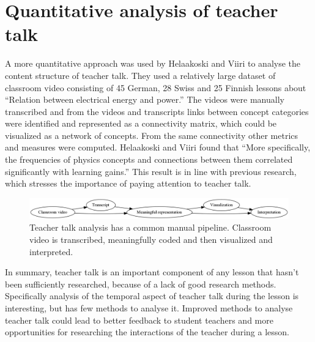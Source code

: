 \documentclass[utf8,english]{gradu3}
\begin{document}
\section{Quantitative analysis of teacher talk}
A more quantitative approach was used by Helaakoski and Viiri \parencite{helaakoskiContentContentStructure2014} to analyse the content structure of teacher talk. They used a relatively large dataset of classroom video consisting of 45 German, 28 Swiss and 25 Finnish lessons about \enquote{Relation  between  electrical  energy  and  power.} The videos were manually transcribed and from the videos and transcripts links between concept categories were identified and represented as a connectivity matrix, which could be visualized as a network of concepts. From the same connectivity other metrics and measures were computed. Helaakoski and Viiri \parencite*{helaakoskiContentContentStructure2014} found that \enquote{More  specifically,  the  frequencies  of  physics  concepts  and  connections  between  them  correlated  significantly  with  learning  gains.} This result is in line with previous research, which stresses the importance of paying attention to teacher talk. \parencite{viiriTeacherTalkPatterns2006,scottTeachingScienceMeaningful2007,scottPedagogicalLinkMaking2011}

\begin{figure}
  \includegraphics[width=\linewidth]{../figures/teacher_talk_manual_pipeline.png}
  \caption{Teacher talk analysis has a common manual pipeline. Classroom video is transcribed, meaningfully coded and then visualized and interpreted.}
  \label{fig:manualpipeline}
\end{figure}

In summary, teacher talk is an important component of any lesson that hasn't been sufficiently researched, because of a lack of good research methods. Specifically analysis of the temporal aspect of teacher talk during the lesson is interesting, but has few methods to analyse it. Improved methods to analyse teacher talk could lead to better feedback to student teachers and more opportunities for researching the interactions of the teacher during a lesson.

\end{document}
